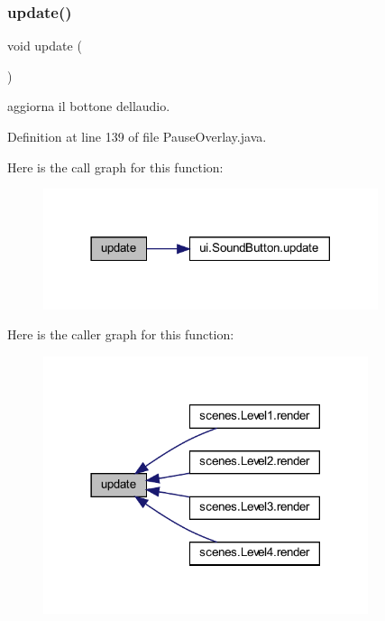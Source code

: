 \subsubsection{\texorpdfstring{update()}{update()}}
{\footnotesize\ttfamily void update (\begin{DoxyParamCaption}{ }\end{DoxyParamCaption})}



aggiorna il bottone dell\textquotesingle{}audio. 



Definition at line 139 of file Pause\+Overlay.\+java.

Here is the call graph for this function\+:\nopagebreak
\begin{figure}[H]
\begin{center}
\leavevmode
\includegraphics[width=278pt]{classui_1_1_pause_overlay_ac5c54df7ed3b930268c8d7752c101725_cgraph}
\end{center}
\end{figure}
Here is the caller graph for this function\+:\nopagebreak
\begin{figure}[H]
\begin{center}
\leavevmode
\includegraphics[width=270pt]{classui_1_1_pause_overlay_ac5c54df7ed3b930268c8d7752c101725_icgraph}
\end{center}
\end{figure}


